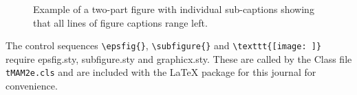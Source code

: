 \documentclass[]{tMAM2e}
\begin{document}
\begin{figure}
\begin{center}
\begin{minipage}{100mm}
%
%
\caption{Example of a two-part figure with individual %
sub-captions showing that all lines of figure captions range left.}%
\label{sample-figure}
\end{minipage}
\end{center}
\end{figure}

The control sequences \verb"\epsfig{}", \verb"\subfigure{}" and \verb"\texttt{[image: ]}" require epsfig.sty,
subfigure.sty and graphicx.sty. These are called by the Class file {\tt tMAM2e.cls} and are included with the LaTeX
package for this journal for convenience.
\end{document}
